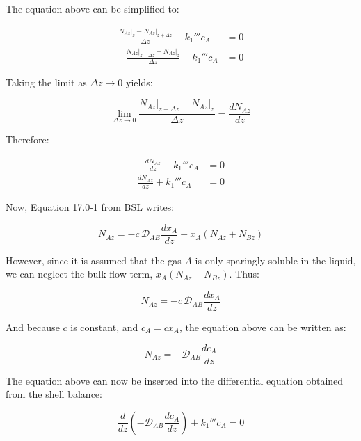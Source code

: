 \documentclass[letterpaper,12pt]{article}
\begin{document}
The equation above can be simplified to:

\begin{equation}
\begin{aligned}
    \frac{N_{Az}\big|_{z} - N_{Az}\big|_{z+\Delta z}}{\Delta z} - k_1''' c_A  &= 0 \\
    -\frac{N_{Az}\big|_{z+\Delta z} - N_{Az}\big|_{z}}{\Delta z} - k_1''' c_A &= 0
\end{aligned}
\end{equation}

Taking the limit as $\Delta z \to 0$ yields:

\begin{equation}
    \lim_{\Delta z \to 0} \frac{N_{Az}\big|_{z+\Delta z} - N_{Az}\big|_{z}}{\Delta z} = \frac{dN_{Az}}{dz}
\end{equation}

Therefore:

\begin{equation}
\begin{aligned}
    -\frac{dN_{Az}}{dz} - k_1''' c_A &= 0 \\
    \frac{dN_{Az}}{dz} + k_1''' c_A  &= 0
\end{aligned}
\end{equation}

Now, Equation 17.0-1 from BSL writes:

\begin{equation}
    N_{Az} = -c\,\mathcal{D}_{AB}\frac{dx_A}{dz} + x_A\left(N_{Az} + N_{Bz}\right)
\end{equation}

However, since it is assumed that the gas $A$ is only sparingly soluble in the liquid, we can neglect the bulk flow term, $x_A\left(N_{Az} + N_{Bz}\right)$. Thus:

\begin{equation}
    N_{Az} = -c\,\mathcal{D}_{AB}\frac{dx_A}{dz} 
\end{equation}

And because $c$ is constant, and $c_A = c x_A$, the equation above can be written as:

\begin{equation}
    N_{Az} = -\mathcal{D}_{AB}\frac{dc_A}{dz}
\end{equation}

The equation above can now be inserted into the differential equation obtained from the shell balance:

\begin{equation}
    \frac{d}{dz}\left(-\mathcal{D}_{AB}\frac{dc_A}{dz}\right) + k_1''' c_A = 0
\end{equation}
\end{document}
